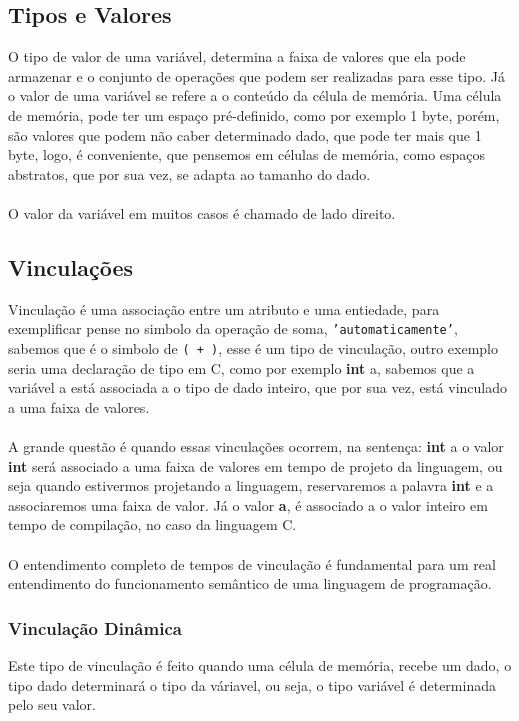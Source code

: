\documentclass[12pt, onecolumn]{article}
\begin{document}
	\subsection{Tipos e Valores}
	O tipo de valor de uma variável, determina a faixa de valores que ela pode
	armazenar e o conjunto de operações que podem ser realizadas para esse tipo.
	Já o valor de uma variável se refere a o conteúdo da célula de memória. 
	Uma célula de memória, pode ter um espaço pré-definido, como por exemplo 
	1 byte, porém, são valores que podem não caber determinado dado, que pode 
	ter mais que 1 byte, logo, é conveniente, que pensemos em células de memória, 
	como espaços abstratos, que por sua vez, se adapta ao tamanho do dado.\\
	\\
	O valor da variável em muitos casos é chamado de lado direito.
	

	\subsection{Vinculações}
	Vinculação é uma associação entre um atributo e uma entiedade, para exemplificar
	pense no simbolo da operação de soma, \texttt{'automaticamente'}, sabemos que 
	é o simbolo de \texttt{( + )}, esse é um tipo de vinculação, outro exemplo seria
	uma declaração de tipo em C, como por exemplo \textbf{int} a, sabemos que a 
	variável a está associada a o tipo de dado inteiro, que por sua vez, está
	vinculado a uma faixa de valores.\\
	\\
	A grande questão é quando essas vinculações ocorrem, na sentença: \textbf{int} a
	o valor \textbf{int} será associado a uma faixa de valores em tempo de 
	projeto da linguagem, ou seja quando estivermos projetando a linguagem, 
	reservaremos a palavra \textbf{int} e a associaremos uma faixa de valor. 
	Já o valor \textbf{a}, é associado a o valor inteiro em tempo de compilação, 
	no caso da linguagem C.\\
	\\
	O entendimento completo de tempos de vinculação é fundamental para um real
	entendimento do funcionamento semântico de uma linguagem de programação.
	
	\subsubsection{\hspace{1cm}Vinculação Dinâmica}
	Este tipo de vinculação é feito quando uma célula de memória, recebe um dado,
	o tipo dado determinará o tipo da váriavel, ou seja, o tipo variável é 
	determinada pelo seu valor.
\end{document}

